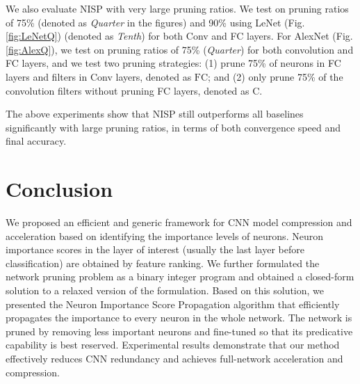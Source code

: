 \documentclass[10pt,twocolumn,letterpaper]{article}
\begin{document}

We also evaluate NISP with very large pruning ratios. We test on pruning ratios of 75\% (denoted as \emph{Quarter} in the figures) and 90\% using LeNet (Fig. \ref{fig:LeNetQ}) (denoted as \emph{Tenth}) for both Conv and FC layers.
For AlexNet (Fig. \ref{fig:AlexQ}), we test on pruning ratios of 75\% (\emph{Quarter}) for both convolution and FC layers, and we test two pruning strategies: (1) prune 75\% of neurons in FC layers and filters in Conv layers, denoted as \emph{$\text{FC}$}; and (2) only prune 75\% of the convolution filters without pruning FC layers, denoted as \emph{$\text{C}$}.

The above experiments show that NISP still outperforms all baselines significantly with large pruning ratios, in terms of both convergence speed and final accuracy.




% 

\section{Conclusion}
We proposed an efficient and generic framework for CNN model compression and acceleration based on identifying the importance levels of neurons. Neuron importance scores in the layer of interest (usually the last layer before classification) are obtained by feature ranking. We further formulated the network pruning problem as a binary integer program and obtained a closed-form solution to a relaxed version of the formulation. Based on this solution, we presented the Neuron Importance Score Propagation algorithm that efficiently propagates the importance to every neuron in the whole network. The network is pruned by removing less important neurons and fine-tuned so that its predicative capability is best reserved. Experimental results demonstrate that our method effectively reduces CNN redundancy and achieves full-network acceleration and compression.

\end{document}
